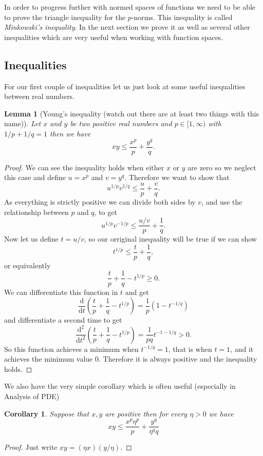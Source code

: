 \documentclass[11pt]{article}
\newtheorem{cor}[thm]{Corollary}
\newtheorem{lem}[thm]{Lemma}
\theoremstyle{definition}
\theoremstyle{remark}
\begin{document}
In order to progress further with normed spaces of functions we need to be able to prove the triangle inequality for the $p$-norms. This inequality is called \emph{Minkowski's inequality}. In the next section we prove it as well as several other inequalities which are very useful when working with function spaces. 


\subsection{Inequalities}

For our first couple of inequalities let us just look at some useful inequalities between real numbers.
\begin{lem}[Young's inequality (watch out there are at least two things with this name)]
Let $x$ and $y$ be two positive real numbers and $p \in [1, \infty)$ with $1/p +1/q = 1$ then we have
\[ xy \leq \frac{x^p}{p} + \frac{y^q}{q}. \]
\end{lem}
\begin{proof}
We can see the inequality holds when either $x$ or $y$ are zero so we neglect this case and define $u = x^p$ and $v = y^q$. Therefore we want to show that
\[ u^{1/p}v^{1/q} \leq \frac{u}{p} + \frac{v}{q}. \] As everything is strictly positive we can divide both sides by $v$, and use the relationship between $p$ and $q$, to get
\[ u^{1/p}v^{-1/p} \leq \frac{u/v}{p} + \frac{1}{q}. \] Now let us define $t = u/v$, so our orriginal inequality will be true if we can show
\[ t^{1/p} \leq \frac{t}{p} + \frac{1}{q}, \] or equivalently \[ \frac{t}{p} + \frac{1}{q} - t^{1/p} \geq 0. \] We can differentiate this function in $t$ and get
\[ \frac{\mathrm{d}}{\mathrm{d}t} \left(  \frac{t}{p} + \frac{1}{q} - t^{1/p}\right) = \frac{1}{p}(1- t^{-1/q}) \] and differentiate a second time to get
\[  \frac{\mathrm{d}^2}{\mathrm{d}t^2} \left(  \frac{t}{p} + \frac{1}{q} - t^{1/p}\right)  =\frac{1}{pq} t^{-1-1/q} >0.\] So this function achieves a minimum when $t^{-1/q} = 1$, that is when $t=1$, and it achieves the minimum value 0. Therefore it is always positive and the inequality holds. 
\end{proof}
We also have the very simple corollary which is often useful (especially in Analysis of PDE)
\begin{cor}
Suppose that $x,y$ are positive then for every $\eta >0$ we have
\[ xy \leq \frac{x^p \eta^p}{p} + \frac{y^q}{\eta^q q} \]
\end{cor}
\begin{proof}
Just write $xy = (\eta x)(y/\eta)$.
\end{proof}
\end{document}
